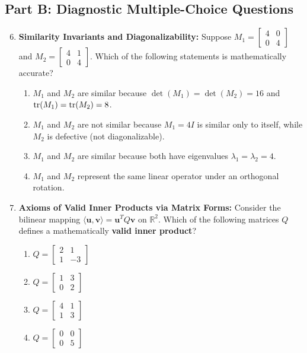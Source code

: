 \subsection*{Part B: Diagnostic Multiple-Choice Questions}
\begin{enumerate}
\setcounter{enumi}{5}
\item \textbf{Similarity Invariants and Diagonalizability:} Suppose $M_1 = \begin{bmatrix} 4 & 0 \\ 0 & 4 \end{bmatrix}$ and $M_2 = \begin{bmatrix} 4 & 1 \\ 0 & 4 \end{bmatrix}$. Which of the following statements is mathematically accurate?
\begin{enumerate}
    \item $M_1$ and $M_2$ are similar because $\det(M_1) = \det(M_2) = 16$ and $\operatorname{tr}(M_1) = \operatorname{tr}(M_2) = 8$.
    \item $M_1$ and $M_2$ are not similar because $M_1 = 4I$ is similar only to itself, while $M_2$ is defective (not diagonalizable).
    \item $M_1$ and $M_2$ are similar because both have eigenvalues $\lambda_1 = \lambda_2 = 4$.
    \item $M_1$ and $M_2$ represent the same linear operator under an orthogonal rotation.
\end{enumerate}

\item \textbf{Axioms of Valid Inner Products via Matrix Forms:} Consider the bilinear mapping $\langle \mathbf{u}, \mathbf{v} \rangle = \mathbf{u}^T Q \mathbf{v}$ on $\mathbb{R}^2$. Which of the following matrices $Q$ defines a mathematically \textbf{valid inner product}?
\begin{enumerate}
    \item $Q = \begin{bmatrix} 2 & 1 \\ 1 & -3 \end{bmatrix}$
    \item $Q = \begin{bmatrix} 1 & 3 \\ 0 & 2 \end{bmatrix}$
    \item $Q = \begin{bmatrix} 4 & 1 \\ 1 & 3 \end{bmatrix}$
    \item $Q = \begin{bmatrix} 0 & 0 \\ 0 & 5 \end{bmatrix}$
\end{enumerate}
\end{enumerate}

